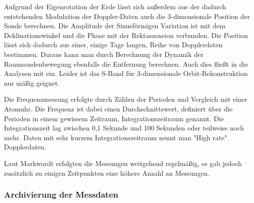 Aufgrund der Eigenrotation der Erde lässt sich außerdem aus der dadurch entstehenden Modulation der Doppler-Daten auch die 3-dimensionale Position der Sonde berechnen. Die Amplitude der Sinusförmigen Variation ist mit dem Deklinationswinkel und die Phase mit der Rektaszension verbunden. Die Position lässt sich dadurch aus einer, einige Tage langen, Reihe von Dopplerdaten bestimmen. Daraus kann man durch Berechnung der Dynamik der Raumsondenbewegung ebenfalls die Entfernung berechnen. Auch dies fließt in die Analysen mit ein.\cite{Anderson2002} %
Leider ist das S-Band für 3-dimensionale Orbit-Rekonstruktion nur mäßig geignet.\cite{Turyshev2004}


Die Frequenzmessung erfolgte durch Zählen der Perioden und Vergleich mit einer Atomuhr\cite{Nieto2007}. %
Die Frequenz ist dabei einen Durchschnittswert, definiert über die Perioden in einem gewissem Zeitraum, Integrationszeitraum genannt. Die Integrationszeit lag zwischen 0,1 Sekunde und 100 Sekunden oder teilweise noch mehr\cite{Markwardt2002}. Daten mit sehr kurzem Integrationszeitraum nennt man "High rate" Dopplerdaten.

Laut Markwardt\cite{Markwardt2002} erfolgten die Messungen weitgehend regelmäßig, es gab jedoch zusätzlich zu einigen Zeitpunkten eine höhere Anzahl an Messungen.



\subsubsection{Archivierung der Messdaten}

